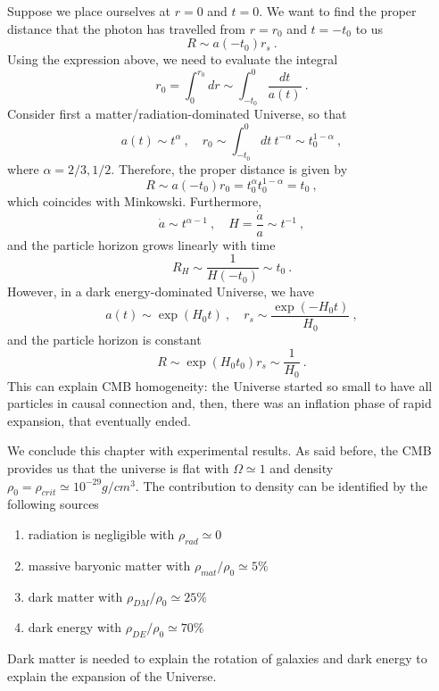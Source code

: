     Suppose we place ourselves at $r = 0$ and $t=0$. We want to find the proper distance that the photon has travelled from $r = r_0$ and $t= - t_0$ to us
    \begin{equation*}
        R \sim a( - t_0) r_s ~.
    \end{equation*}
    Using the expression above, we need to evaluate the integral
    \begin{equation*}
        r_0 = \int_0^{r_0} dr \sim \int_{-t_0}^0 \frac{dt}{a(t)} ~.
    \end{equation*}
    Consider first a matter/radiation-dominated Universe, so that
    \begin{equation*}
        a(t) \sim t^\alpha ~, \quad r_0 \sim \int_{-t_0}^0 dt ~ t^{- \alpha} \sim t_0^{1 - \alpha} ~,
    \end{equation*}
    where $\alpha = 2 / 3, 1 / 2$. Therefore, the proper distance is given by
    \begin{equation*}
        R \sim a(-t_0) r_0 = t^\alpha_0 t^{1-\alpha}_0 = t_0 ~,
    \end{equation*}
    which coincides with Minkowski. Furthermore, 
    \begin{equation*}
        \dot a \sim t^{\alpha - 1} ~, \quad H = \frac{\dot a}{a} \sim t^{-1} ~,
    \end{equation*}
    and the particle horizon grows linearly with time  
    \begin{equation}
        R_H \sim \frac{1}{H(-t_0)} \sim t_0 ~.
    \end{equation}
    However, in a dark energy-dominated Universe, we have
    \begin{equation*}
        a(t) \sim \exp(H_0 t) ~, \quad r_s \sim \frac{\exp(-H_0 t)}{H_0} ~,
    \end{equation*}
    and the particle horizon is constant
    \begin{equation*}
        R \sim \exp(H_0 t_0) r_s \sim \frac{1}{H_0} ~.
    \end{equation*}
    This can explain CMB homogeneity: the Universe started so small to have all particles in causal connection and, then, there was an inflation phase of rapid expansion, that eventually ended.

    We conclude this chapter with experimental results. As said before, the CMB provides us that the universe is flat with $\Omega \simeq 1$ and density $\rho_0 = \rho_{crit} \simeq 10^{-29} g/cm^3$. The contribution to density can be identified by the following sources 
    \begin{enumerate}
        \item radiation is negligible with $\rho_{rad} \simeq 0$
        \item massive baryonic matter with $\rho_{mat} / \rho_0 \simeq 5 \%$
        \item dark matter with $\rho_{DM} / \rho_0 \simeq 25 \%$
        \item dark energy with $\rho_{DE} / \rho_0 \simeq 70 \%$
    \end{enumerate}
    Dark matter is needed to explain the rotation of galaxies and dark energy to explain the expansion of the Universe.

